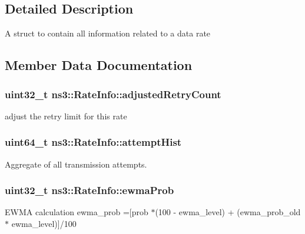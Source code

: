 \subsection{Detailed Description}
A struct to contain all information related to a data rate 

\subsection{Member Data Documentation}
\subsubsection[{\texorpdfstring{adjusted\+Retry\+Count}{adjustedRetryCount}}]{\setlength{\rightskip}{0pt plus 5cm}uint32\+\_\+t ns3\+::\+Rate\+Info\+::adjusted\+Retry\+Count}\hypertarget{structns3_1_1RateInfo_a43cec6f05fc31f89b282febdc8b7fd1d}{}\label{structns3_1_1RateInfo_a43cec6f05fc31f89b282febdc8b7fd1d}


adjust the retry limit for this rate 

\subsubsection[{\texorpdfstring{attempt\+Hist}{attemptHist}}]{\setlength{\rightskip}{0pt plus 5cm}uint64\+\_\+t ns3\+::\+Rate\+Info\+::attempt\+Hist}\hypertarget{structns3_1_1RateInfo_afabcdb30c89c23c38385f80057486f9a}{}\label{structns3_1_1RateInfo_afabcdb30c89c23c38385f80057486f9a}


Aggregate of all transmission attempts. 

\subsubsection[{\texorpdfstring{ewma\+Prob}{ewmaProb}}]{\setlength{\rightskip}{0pt plus 5cm}uint32\+\_\+t ns3\+::\+Rate\+Info\+::ewma\+Prob}\hypertarget{structns3_1_1RateInfo_a10c85a572d1d7abd171f4c3f377b6262}{}\label{structns3_1_1RateInfo_a10c85a572d1d7abd171f4c3f377b6262}
E\+W\+MA calculation ewma\+\_\+prob =\mbox{[}prob $\ast$(100 -\/ ewma\+\_\+level) + (ewma\+\_\+prob\+\_\+old $\ast$ ewma\+\_\+level)\mbox{]}/100 
